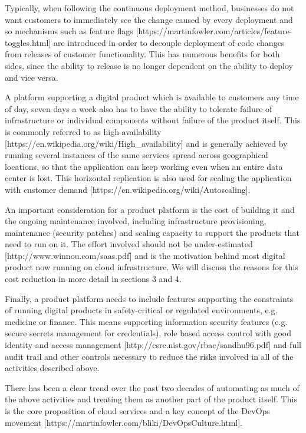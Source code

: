 \documentclass[reprint,amsmath,amssymb,aps]{revtex4-1}
\begin{document}
Typically, when following the continuous deployment method, businesses do not want customers to immediately see the change caused by every deployment and so mechanisms such as feature flags [https://martinfowler.com/articles/feature-toggles.html] are introduced in order to decouple deployment of code changes from releases of customer functionality. This has numerous benefits for both sides, since the ability to release is no longer dependent on the ability to deploy and vice versa.

A platform supporting a digital product which is available to customers any time of day, seven days a week also has to have the ability to tolerate failure of infrastructure or individual components without failure of the product itself. This is commonly referred to as high-availability [https://en.wikipedia.org/wiki/High_availability] and is generally achieved by running several instances of the same services spread across geographical locations, so that the application can keep working even when an entire data center is lost. This horizontal replication is also used for scaling the application with customer demand [https://en.wikipedia.org/wiki/Autoscaling].

An important consideration for a product platform is the cost of building it and the ongoing maintenance involved, including infrastructure provisioning, maintenance (security patches) and scaling capacity to support the products that need to run on it. The effort involved should not be under-estimated [http://www.winnou.com/saas.pdf] and is the motivation behind most digital product now running on cloud infrastructure. We will discuss the reasons for this cost reduction in more detail in sections 3 and 4.

Finally, a product platform needs to include features supporting the constraints of running digital products in safety-critical or regulated environments, e.g. medicine or finance. This means supporting information security features (e.g. secure secrets management for credentials), role based access control with good identity and access management [http://csrc.nist.gov/rbac/sandhu96.pdf] and full audit trail and other controls necessary to reduce the risks involved in all of the activities described above.

There has been a clear trend over the past two decades of automating as much of the above activities and treating them as another part of the product itself. This is the core proposition of cloud services and a key concept of the DevOps movement [https://martinfowler.com/bliki/DevOpsCulture.html].
\end{document}
